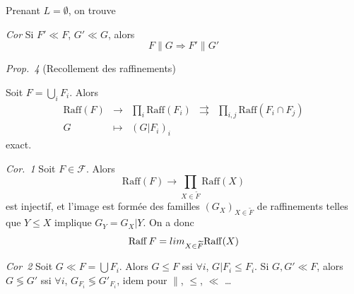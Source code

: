 \documentclass[11pt,a4paper]{article}
\begin{document}

Prenant $L = \emptyset$, on trouve

\emph{Cor}  Si $F' \ll F$, $G' \ll G$, alors
\[
  F \parallel G \Longrightarrow F' \parallel G'
\]

\emph{Prop.~4} (Recollement des raffinements)

Soit $F = \bigcup_i F_i$. Alors
\[
\begin{array}{ccccc}
  \mathrm{Raff}(F) & \longrightarrow & \prod_i \mathrm{Raff}(F_i) & \rightrightarrows & \prod_{i,j} \mathrm{Raff}(F_i \cap F_j) \\
  G & \longmapsto & (G|F_i)_i & &
\end{array}
\]
exact.


\emph{Cor.~1} Soit $F \in \mathcal{F}$. Alors
\[
  \mathrm{Raff}(F) \longrightarrow \prod_{X \in \widetilde{F}} \mathrm{Raff}(X)
\]
\struck{\ill{}} est injectif, et l'image est formée des familles $(G_X)_{X \in \widetilde{F}}$ de raffinements telles que $Y \leq X$ implique $G_Y = G_X | Y$. On a donc
\[
  \mathrm{Raff}\, F = \varprojlim_{X \in \widetilde{F}} \mathrm{Raff}(X)
\]


 \emph{Cor~2} Soit $G \ll F = \bigcup F_i$. Alors $G \leq F$ ssi  $\forall i$, $G|F_i \leq F_i$. \struck{\ill{}} Si $G, G' \ll F$, alors $G \lessgtr G'$ ssi $\forall i$, $G_{F_i} \lessgtr G'_{F_i}$, idem pour $\parallel$, $\leq$, $\ll$ …

\end{document}
